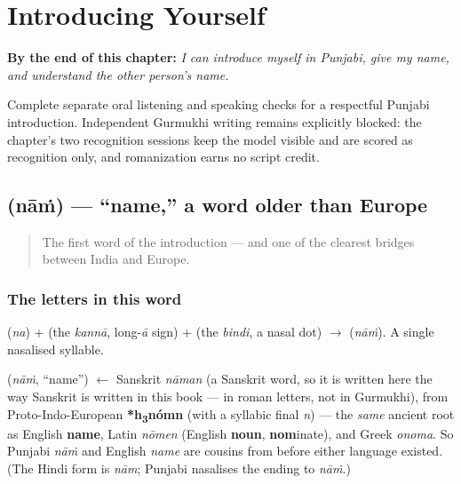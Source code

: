 
\chapter{Introducing Yourself}
\label{ch:introductions}

\begin{chapteropening}
\textbf{By the end of this chapter:} \emph{I can introduce myself in Punjabi, give my name, and understand the other person's name.}

Complete separate oral listening and speaking checks for a respectful Punjabi introduction. Independent Gurmukhi writing remains explicitly blocked: the chapter's two recognition sessions keep the model visible and are scored as recognition only, and romanization earns no script credit.
\end{chapteropening}

\section[\texorpdfstring{\pa{ਨਾਂ} (nāṁ)}{ਨਾਂ (nāṁ)}]{ (nāṁ) — \textquotedblleft{}name,\textquotedblright{} a word older than Europe}

\label{lesson:PA-C02-naam}



\begin{quote}
The first word of the introduction — and one of the clearest bridges between India and Europe.
\end{quote}

\subsection*{The letters in this word}
\textbf{} (\emph{na}) + \textbf{} (the \emph{kannā}, long-\emph{ā} sign) + \textbf{} (the \emph{bindi}, a nasal dot) $\to$ \textbf{} (\emph{nāṁ}). A single nasalised syllable.

\begin{cousinweb}
\textbf{} (\emph{nāṁ}, \textquotedblleft{}name\textquotedblright{}) $\leftarrow$ Sanskrit \emph{nāman} (a Sanskrit word, so it is written here the way Sanskrit is written in this book — in roman letters, not in Gurmukhi), from Proto-Indo-European \textbf{*h\textsubscript{3}nómn} (with a syllabic final \emph{n}) — the \emph{same} ancient root as English \textbf{name}, Latin \emph{nōmen} (English \textbf{noun}, \textbf{nom}inate), and Greek \emph{onoma}. So Punjabi \emph{nāṁ} and English \emph{name} are cousins from before either language existed. (The Hindi form is \emph{nām}; Punjabi nasalises the ending to \emph{nāṁ}.)
\end{cousinweb}

